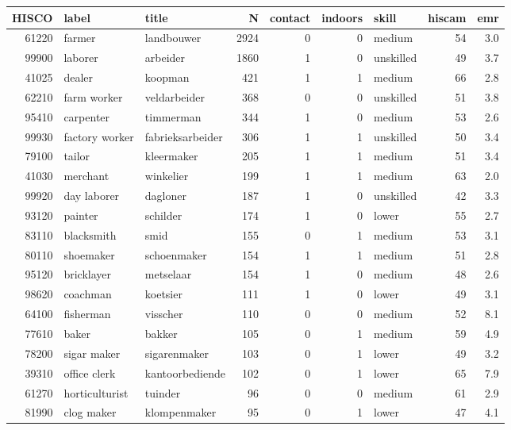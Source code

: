 \begin{table}[h!]
\centering
\begin{tabular}{rllrrrlrr}
  \hline
HISCO & label & title & N & contact & indoors & skill & hiscam & emr \\ 
  \hline
61220 & farmer & landbouwer & 2924 &  0 &  0 & medium & 54 & 3.0 \\ 
  99900 & laborer & arbeider & 1860 &  1 &  0 & unskilled & 49 & 3.7 \\ 
  41025 & dealer & koopman & 421 &  1 &  1 & medium & 66 & 2.8 \\ 
  62210 & farm worker & veldarbeider & 368 &  0 &  0 & unskilled & 51 & 3.8 \\ 
  95410 & carpenter & timmerman & 344 &  1 &  0 & medium & 53 & 2.6 \\ 
  99930 & factory worker & fabrieksarbeider & 306 &  1 &  1 & unskilled & 50 & 3.4 \\ 
  79100 & tailor & kleermaker & 205 &  1 &  1 & medium & 51 & 3.4 \\ 
  41030 & merchant & winkelier & 199 &  1 &  1 & medium & 63 & 2.0 \\ 
  99920 & day laborer & dagloner & 187 &  1 &  0 & unskilled & 42 & 3.3 \\ 
  93120 & painter & schilder & 174 &  1 &  0 & lower & 55 & 2.7 \\ 
  83110 & blacksmith & smid & 155 &  0 &  1 & medium & 53 & 3.1 \\ 
  80110 & shoemaker & schoenmaker & 154 &  1 &  1 & medium & 51 & 2.8 \\ 
  95120 & bricklayer & metselaar & 154 &  1 &  0 & medium & 48 & 2.6 \\ 
  98620 & coachman & koetsier & 111 &  1 &  0 & lower & 49 & 3.1 \\ 
  64100 & fisherman & visscher & 110 &  0 &  0 & medium & 52 & 8.1 \\ 
  77610 & baker & bakker & 105 &  0 &  1 & medium & 59 & 4.9 \\ 
  78200 & sigar maker & sigarenmaker & 103 &  0 &  1 & lower & 49 & 3.2 \\ 
  39310 & office clerk & kantoorbediende & 102 &  0 &  1 & lower & 65 & 7.9 \\ 
  61270 & horticulturist & tuinder & 96 &  0 &  0 & medium & 61 & 2.9 \\ 
  81990 & clog maker & klompenmaker & 95 &  0 &  1 & lower & 47 & 4.1 \\ 

\end{tabular}
\end{table}
